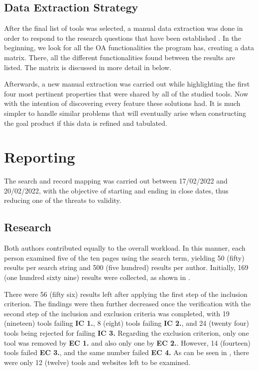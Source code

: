 

\subsection{Data Extraction Strategy}\label{sec:gl-planning-datastrategy}

After the final list of tools was selected, a manual data extraction was done in order to respond to the research questions that have been established . In the beginning, we look for all the \ac{OA} functionalities the program has, creating a data matrix. There, all the different functionalities found between the results are listed. The matrix is discussed in more detail in  below.

Afterwards, a new manual extraction was carried out while highlighting the first four most pertinent properties that were shared by all of the studied tools. Now with the intention of discovering every feature these solutions had. It is much simpler to handle similar problems that will eventually arise when constructing the goal product if this data is refined and tabulated.

\section{Reporting}\label{sec:gl-reporting}

The search and record mapping was carried out between 17/02/2022 and 20/02/2022, with the objective of starting and ending in close dates, thus reducing one of the threats to validity.

\subsection{Research}\label{sec:gl-research}

Both authors contributed equally to the overall workload. In this manner, each person examined five of the ten pages using the search term, yielding 50 (fifty) results per search string and 500 (five hundred) results per author. Initially, 169 (one hundred sixty nine) results were collected, as shown in .

There were 56 (fifty six) results left after applying the first step of the inclusion criterion. The findings were then further decreased once the verification with the second step of the inclusion and exclusion criteria was completed, with 19 (nineteen) tools failing \textbf{IC 1.}, 8 (eight) tools failing \textbf{IC 2.}, and 24 (twenty four) tools being rejected for failing \textbf{IC 3.} Regarding the exclusion criterion, only one tool was removed by \textbf{EC 1.} and also only one by \textbf{EC 2.}. However, 14 (fourteen) tools failed \textbf{EC 3.}, and the same number failed \textbf{EC 4.} As can be seen in , there were only 12 (twelve) tools and websites left to be examined.

